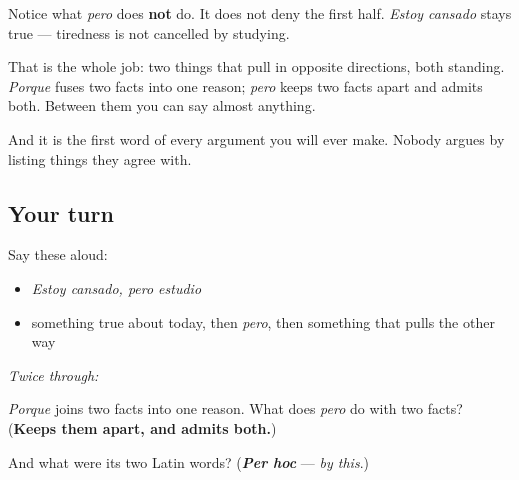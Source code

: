 \begin{culture}
Notice what \emph{pero} does \textbf{not} do. It does not deny the first half. \emph{Estoy cansado} stays true — tiredness is not cancelled by studying.

That is the whole job: two things that pull in opposite directions, both standing. \emph{Porque} fuses two facts into one reason; \emph{pero} keeps two facts apart and admits both. Between them you can say almost anything.

And it is the first word of every argument you will ever make. Nobody argues by listing things they agree with.
\end{culture}

\subsection*{Your turn}
Say these aloud:

\begin{itemize}
\raggedright
  \item \emph{Estoy cansado, pero estudio}
  \item something true about today, then \emph{pero}, then something that pulls the other way
\end{itemize}

\emph{Twice through:}

\begin{tcolorbox}[breakable,colback=teal!4,colframe=teal!35!black,title={Before you move on}]
\emph{Porque} joins two facts into one reason. What does \emph{pero} do with two facts? (\textbf{Keeps them apart, and admits both.})

And what were its two Latin words? (\emph{\textbf{Per hoc}} — \emph{by this}.)
\end{tcolorbox}
